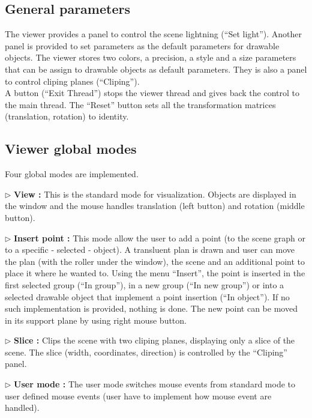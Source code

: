 \subsection{General parameters}

The viewer provides a panel to control the scene lightning (``Set
light''). Another panel is provided to set parameters as the default
parameters for drawable objects. The viewer stores two colors, a
precision, a style and a size parameters that can be assign to
drawable objects as default parameters. They is also a panel to control cliping planes (``Cliping''). \\
A button (``Exit Thread'') stops the viewer thread and gives back the
control to the main thread. The ``Reset'' button sets all the
transformation matrices (translation, rotation) to identity.

\subsection{Viewer global modes}

Four global modes are implemented. 
\begin{description}
\item{$\triangleright$} {\bf View : } This is the standard mode for
visualization. Objects are displayed in the  window and
the mouse handles translation (left button) and rotation (middle button).
\item{$\triangleright$} {\bf Insert point : } This mode allow the user 
to add a point (to the scene graph or to a specific - selected -
object). A transluent plan is drawn and user can move the
plan (with the roller under the window), the scene and an additional point to
place it where he wanted to. Using the menu ``Insert'', the point is
inserted in the first selected group (``In group''), in a new group
(``In new group'') or into a selected drawable object that implement a point
insertion (``In object''). If no such implementation is provided,
nothing is done. The new point can be moved in its support plane by
using right mouse button.
\item{$\triangleright$} {\bf Slice : } Clips the scene with two
cliping planes, displaying only a slice of the scene. The slice
(width, coordinates, direction) is controlled by the ``Cliping''
panel.
\item{$\triangleright$} {\bf User mode : } The user mode switches
mouse events from standard mode to user defined mouse events (user
have to implement how mouse event are handled).  
\end{description}


